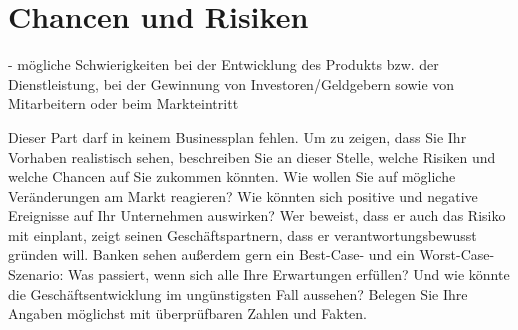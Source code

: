 \section{Chancen und Risiken}

\begin{multicols}{2}

- mögliche Schwierigkeiten bei der Entwicklung des Produkts bzw. der Dienstleistung, bei der Gewinnung von Investoren/Geldgebern sowie von Mitarbeitern oder beim Markteintritt 

Dieser Part darf in keinem Businessplan fehlen. Um zu zeigen, dass Sie Ihr Vorhaben realistisch sehen, beschreiben Sie an dieser Stelle, welche Risiken und welche Chancen auf Sie zukommen könnten. Wie wollen Sie auf mögliche Veränderungen am Markt reagieren? Wie könnten sich positive und negative Ereignisse auf Ihr Unternehmen auswirken? Wer beweist, dass er auch das Risiko mit einplant, zeigt seinen Geschäftspartnern, dass er verantwortungsbewusst gründen will. Banken sehen außerdem gern ein Best-Case- und ein Worst-Case-Szenario: Was passiert, wenn sich alle Ihre Erwartungen erfüllen? Und wie könnte die Geschäftsentwicklung im ungünstigsten Fall aussehen? Belegen Sie Ihre Angaben möglichst mit überprüfbaren Zahlen und Fakten.

\end{multicols}